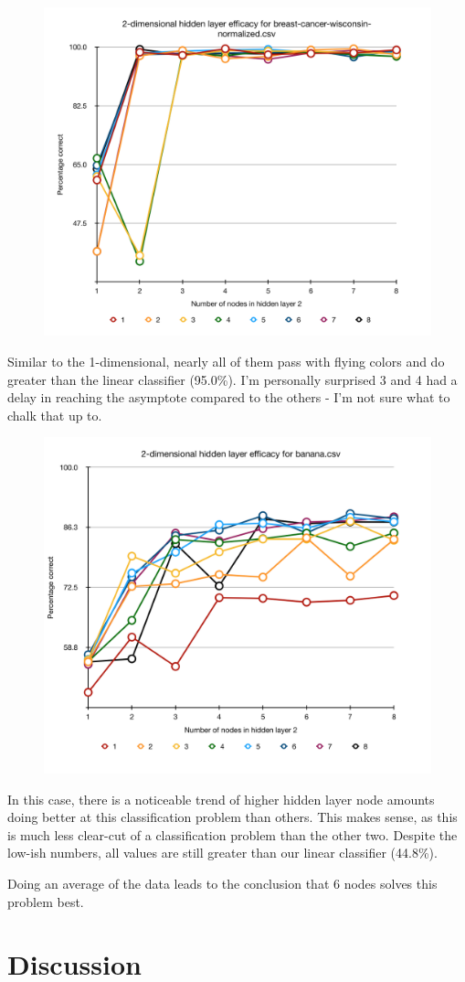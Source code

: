 \documentclass[12pt]{extarticle}
\begin{document}
\begin{figure}[H]
\centering
\includegraphics[width=0.6\linewidth]{breast-2d}
\end{figure}

Similar to the 1-dimensional, nearly all of them pass with flying colors and do greater than the linear classifier (95.0\%). I'm personally surprised 3 and 4 had a delay in reaching the asymptote compared to the others - I'm not sure what to chalk that up to.

\begin{figure}[H]
\centering
\includegraphics[width=0.6\linewidth]{banana-2d}
\end{figure}

In this case, there is a noticeable trend of higher hidden layer node amounts doing better at this classification problem than others. This makes sense, as this is much less clear-cut of a classification problem than the other two. Despite the low-ish numbers, all values are still greater than our linear classifier (44.8\%).

Doing an average of the data leads to the conclusion that 6 nodes solves this problem best.

\section{Discussion}
\end{document}
